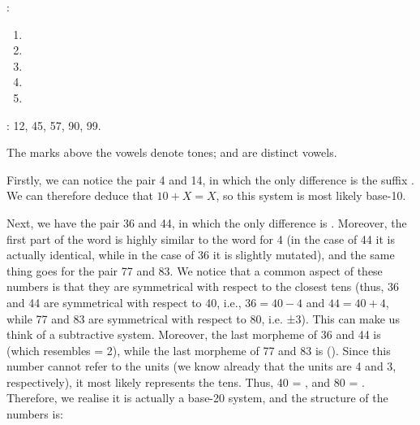 \begin{refsection}
\begin{problem}{\langnameYoruba}{\nameHSomers}{}
\begin{assgts}
\item \taskWriteNumbers:
\begin{multicols}{3}
\begin{enumerate}[label = \alph*.]
    \item {}
    \item {}
    \item {}
    \item {}
    \item {}
    \blankitem
\end{enumerate}
\end{multicols}
\item \taskWriteIn{\langnameYoruba}: 12, 45, 57, 90, 99.
\end{assgts}

\begin{tblsWarning}
The marks above the vowels denote tones;  and  are distinct vowels.
\end{tblsWarning}
\end{problem}

\begin{mysolution}

Firstly, we can notice the pair 4 and 14, in which the only difference is the suffix . We can therefore deduce that $10 + X = X$, so this system is most likely base-10.

Next, we have the pair 36 and 44, in which the only difference is . Moreover, the first part of the word is highly similar to the word for 4 (in the case of 44 it is actually identical, while in the case of 36 it is slightly mutated), and the same thing goes for the pair 77 and 83. We notice that a common aspect of these numbers is that they are symmetrical with respect to the closest tens (thus, 36 and 44 are symmetrical with respect to 40, i.e., $36 = 40 - 4$ and $44 = 40 + 4$, while 77 and 83 are symmetrical with respect to 80, i.e. ±3). This can make us think of a subtractive system. Moreover, the last morpheme of 36 and 44 is  (which resembles  = 2), while the last morpheme of 77 and 83 is  (). Since this number cannot refer to the units (we know already that the units are 4 and 3, respectively), it most likely represents the tens. Thus, 40 = , and 80 = . Therefore, we realise it is actually a base-20 system, and the structure of the numbers is:


\end{mysolution}
\end{refsection}
